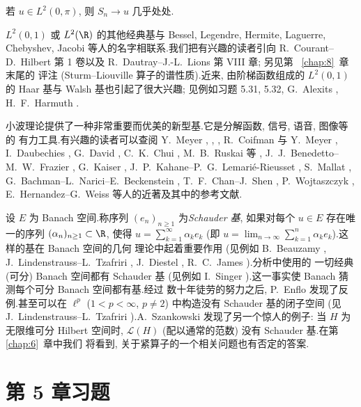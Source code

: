 \begin{theorem}[Carleson]
\label{thm:5.17}
若 $u\in L^2(0,\pi)$, 则 $S_n\to u$ 几乎处处.
\end{theorem}

$L^2(0,1)$ 或 $L^2(\R)$ 的其他经典基与 Bessel, Legendre, Hermite, Laguerre, Chebyshev, Jacobi 等人的名字相联系.我们把有兴趣的读者引向
R.~Courant--D.~Hilbert  第 1 卷以及
R.~Dautray--J.-L.~Lions  第 VIII 章; 另见第~
\ref{chap:8}~章末尾的
评注 (Sturm--Liouville 算子的谱性质).近来, 由阶梯函数组成的 $L^2(0,1)$ 的
Haar 基与 Walsh 基也引起了很大兴趣; 见例如习题 5.31, 5.32, G.~Alexits
, H.~F.~Harmuth .

小波理论提供了一种非常重要而优美的新型基.它是分解函数, 信号, 语音, 图像等的
有力工具.有兴趣的读者可以查阅 Y.~Meyer , , , R.~Coifman 与 Y.~Meyer , I.~Daubechies , G.~David , C.~K.~Chui , M.~B.~Ruskai 等 , J.~J.~Benedetto--M.~W.~Frazier , G.~Kaiser
, J.~P.~Kahane--P.~G.~Lemarié-Rieusset
, S.~Mallat , G.~Bachman--L.~Narici--E.~Beckenstein , T.~F.~Chan--J.~Shen , P.~Wojtaszczyk , E.~Hernandez--G.~Weiss  等人的近著及其中的参考文献.

设 $E$ 为 Banach 空间.称序列 $(e_n)_{n\ge1}$ 为\emph{Schauder 基}, 如果对每个
$u\in E$ 存在唯一的序列 $(\alpha_n)_{n\ge1}\subset\R$, 使得
$u=\sum_{k=1}^\infty\alpha_ke_k$ (即
$u=\lim_{n\to\infty}\sum_{k=1}^n\alpha_ke_k$).这样的基在 Banach 空间的几何
理论中起着重要作用 (见例如 B.~Beauzamy , J.~Lindenstrauss--L.~Tzafriri , J.~Diestel , R.~C.~James ).分析中使用的
一切经典 (可分) Banach 空间都有 Schauder 基 (见例如 I.~Singer
).这一事实使 Banach 猜测每个可分 Banach 空间都有基.经过
数十年徒劳的努力之后, P.~Enflo  发现了反例.甚至可以在
$\ell^p$ ($1<p<\infty$, $p\ne2$) 中构造没有 Schauder 基的闭子空间 (见
J.~Lindenstrauss--L.~Tzafriri ).A.~Szankowski
 发现了另一个惊人的例子: 当 $H$ 为无限维可分 Hilbert
空间时, $\mathcal{L}(H)$ (配以通常的范数) 没有 Schauder 基.在第~
\ref{chap:6}~章中我们
将看到, 关于紧算子的一个相关问题也有否定的答案.
\section*{第 5 章习题}

